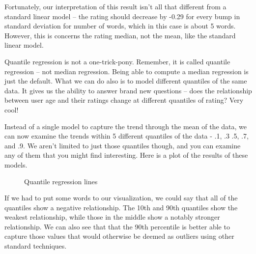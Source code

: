 \documentclass[
  letterpaper,
]{krantz}
\begin{document}
Fortunately, our interpretation of this result isn't all that different
from a standard linear model -- the rating should decrease by -0.29 for
every bump in standard deviation for number of words, which in this case
is about 5 words. However, this is concerns the rating median, not the
mean, like the standard linear model.

Quantile regression is not a one-trick-pony. Remember, it is called
quantile regression -- not median regression. Being able to compute a
median regression is just the default. What we can do also is to model
different quantiles of the same data. It gives us the ability to answer
brand new questions -- does the relationship between user age and their
ratings change at different quantiles of rating? Very cool!

Instead of a single model to capture the trend through the mean of the
data, we can now examine the trends within 5 different quantiles of the
data - .1, .3 .5, .7, and .9. We aren't limited to just those quantiles
though, and you can examine any of them that you might find interesting.
Here is a plot of the results of these models.

\begin{figure}[H]


\caption{\label{fig-quantile-lines}Quantile regression lines}

\end{figure}%

If we had to put some words to our visualization, we could say that all
of the quantiles show a negative relationship. The 10th and 90th
quantiles show the weakest relationship, while those in the middle show
a notably stronger relationship. We can also see that that the 90th
percentile is better able to capture those values that would otherwise
be deemed as outliers using other standard techniques.
\end{document}
